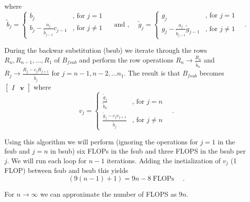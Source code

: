 \documentclass[final, 3p, times, 11.5pt]{article}
\begin{document}
where $$
\tilde{b}_j = 
\begin{cases} 
b_j \quad  & \text{, for } j=1 \\
b_j - \frac{a_j}{\tilde{b}_{j-1}}c_{j-1} & \text{, for } j\neq 1
\end{cases}
\quad \text{ and , } \quad
\tilde{g}_j = 
\begin{cases} 
g_j \quad  & \text{, for } j=1 \\
g_j - \frac{a_j}{\tilde{b}_{j-1}}\tilde{g}_{j-1} & \text{, for } j\neq 1
\end{cases} \quad .
$$

During the backwar substitution (bsub) we iterate through the rows $R_n, R_{n-1}, ..., R_1$ of $B_{fsub}$ and perform the row operations $R_n \to \frac{R_n}{\tilde{b}_n}$ and $R_j \to \frac{R_j -c_jR_{j+1}}{\tilde{b}_j}$ for $j=n-1, n-2, ... n_1$. The result is that $B_{fsub}$ becomes $\begin{bmatrix}I & \mathbf{v} \end{bmatrix}$ where
$$
v_j = 
\begin{cases} 
\frac{\tilde{g}_j}{\tilde{b}_n} \quad  & \text{, for } j=n \\
\frac{\tilde{g}_j - c_jv_{j+1}}{\tilde{b}_j} & \text{, for } j\neq n
\end{cases} \quad .
$$

Using this algorithm we will perform (ignoring the operations for $j=1$ in the fsub and $j=n$ in bsub) six FLOPs in the fsub and three FLOPS in the bsub per $j$. We will run each loop for $n-1$ iterations. Adding the inetialization of $v_j$ (1 FLOP) between fsub and bsub this yields 
$$
(9(n-1)+1) = 9n-8 \operatorname{FLOPs} \quad.
$$

For $n\to \infty$ we can approximate the number of FLOPS as $9n$.
\end{document}
